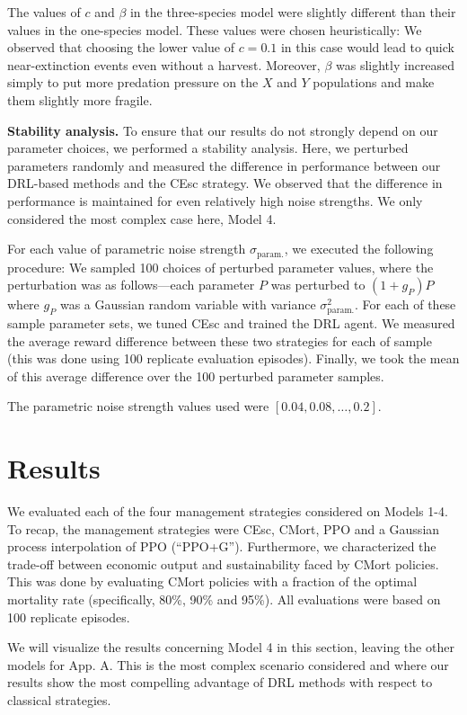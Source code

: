 \documentclass{article}
\begin{document}
The values of \(c\) and \(\beta\) in the three-species model were
slightly different than their values in the one-species model. These
values were chosen heuristically: We observed that choosing the lower
value of \(c=0.1\) in this case would lead to quick near-extinction
events even without a harvest. Moreover, \(\beta\) was slightly
increased simply to put more predation pressure on the \(X\) and \(Y\)
populations and make them slightly more fragile.

\textbf{Stability analysis.} To ensure that our results do not strongly
depend on our parameter choices, we performed a stability analysis.
Here, we perturbed parameters randomly and measured the difference in
performance between our DRL-based methods and the CEsc strategy. We
observed that the difference in performance is maintained for even
relatively high noise strengths. We only considered the most complex
case here, Model 4.

For each value of parametric noise strength \(\sigma_{\text{param.}}\),
we executed the following procedure: We sampled 100 choices of perturbed
parameter values, where the perturbation was as follows---each parameter
\(P\) was perturbed to \((1+g_P)P\) where \(g_P\) was a Gaussian random
variable with variance \(\sigma_{\text{param.}}^2\). For each of these
sample parameter sets, we tuned CEsc and trained the DRL agent. We
measured the average reward difference between these two strategies for
each of sample (this was done using 100 replicate evaluation episodes).
Finally, we took the mean of this average difference over the 100
perturbed parameter samples.

The parametric noise strength values used were
\([0.04, 0.08, \dots, 0.2]\).

\hypertarget{results}{%
\section{Results}\label{results}}

We evaluated each of the four management strategies considered on Models
1-4. To recap, the management strategies were CEsc, CMort, PPO and a
Gaussian process interpolation of PPO (``PPO+G''). Furthermore, we
characterized the trade-off between economic output and sustainability
faced by CMort policies. This was done by evaluating CMort policies with
a fraction of the optimal mortality rate (specifically, 80\%, 90\% and
95\%). All evaluations were based on 100 replicate episodes.

We will visualize the results concerning Model 4 in this section,
leaving the other models for App. A. This is the most complex scenario
considered and where our results show the most compelling advantage of
DRL methods with respect to classical strategies.
\end{document}
